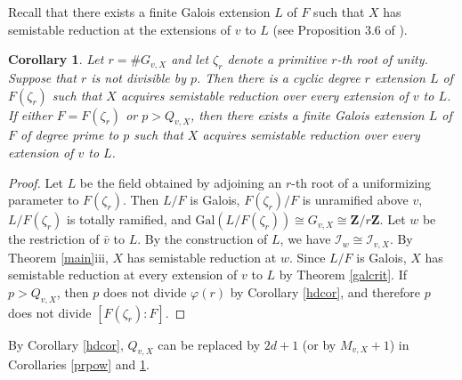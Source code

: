 \documentclass{amsart}
\def\Z{{\mathbf Z}}
\def\Gal{\mathrm{Gal}}
\def\I{{\mathcal I}}
\def\II{{{\mathcal I}_{v,X}}}
\newtheorem{cor}[thm]{Corollary}
\theoremstyle{definition}
\begin{document}
Recall that there exists a finite Galois extension $L$ of $F$
such that $X$ has semistable reduction at the extensions 
of ${v}$ to $L$ (see Proposition 3.6 of \cite{SGA}).

\begin{cor}
\label{Gal}
Let $r = \#G_{v,X}$ and let $\zeta_{r}$ denote a primitive $r$-th 
root of unity.
Suppose that $r$ is not divisible by $p$.
Then there is a cyclic 
degree $r$ extension $L$ of $F(\zeta_{r})$ such
that $X$ acquires semistable reduction over every extension of $v$
to $L$.  
If either $F = F(\zeta_r)$ or $p > Q_{v,X}$, 
then there exists a finite Galois extension $L$ of $F$ 
of degree prime to $p$ such
that $X$ acquires semistable reduction over every extension of $v$
to $L$.  
\end{cor}

\begin{proof}
Let $L$ be the field obtained by adjoining 
an $r$-th root of a uniformizing parameter to $F(\zeta_{r})$.
Then $L/F$ is Galois,
$F(\zeta_{r})/F$ is unramified above $v$, $L/F(\zeta_{r})$
is totally ramified, and 
$\Gal(L/F(\zeta_{r})) \cong G_{v,X} \cong \Z/r\Z$.
Let $w$ be the restriction of ${\bar v}$ to $L$. 
By the construction of $L$, we have $\I_{w} \cong \II$. 
By Theorem \ref{main}iii, $X$ has semistable reduction at $w$.
Since $L/F$ is Galois, $X$ has semistable reduction at every
extension of $v$ to $L$ by Theorem \ref{galcrit}.
If $p > Q_{v,X}$, then  
$p$ does not divide $\varphi(r)$
by Corollary \ref{hdcor}, and therefore
$p$ does not divide $[F(\zeta_r):F]$. 
\end{proof}

By Corollary \ref{hdcor}, $Q_{v,X}$ can be replaced by $2d+1$ 
(or by $M_{v,X} + 1$) in Corollaries \ref{prpow} and
\ref{Gal}.
\end{document}
